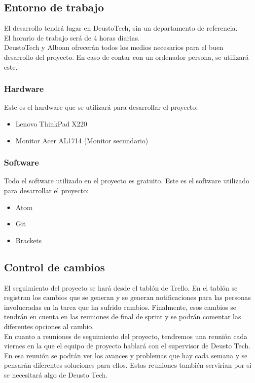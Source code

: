 \subsection{Entorno de trabajo}
El desarrollo tendrá lugar en DeustoTech, sin un departamento de referencia.\\

El horario de trabajo será de 4 horas diarias.\\

DeustoTech y Alboan ofrecerán todos los medios necesarios para el buen desarrollo del proyecto. En caso de contar con un ordenador persona, se utilizará este.

\subsubsection{Hardware}
Este es el hardware que se utilizará para desarrollar el proyecto:
\begin{itemize}
	\item Lenovo ThinkPad X220
	\item Monitor Acer AL1714 (Monitor secundario)
\end{itemize}

\subsubsection{Software}
Todo el software utilizado en el proyecto es gratuito. Este es el software utilizado para desarrollar el proyecto:
\begin{itemize}
	\item Atom
	\item Git
	\item Brackets
\end{itemize}

\subsection{Control de cambios}
El seguimiento del proyecto se hará desde el tablón de Trello. En el tablón se registran los cambios que se generan y se generan notificaciones para las personas involucradas en la tarea que ha sufrido cambios. Finalmente, esos cambios se tendrán en cuenta en las reuniones de final de sprint y se podrán comentar las diferentes opciones al cambio.\\

En cuanto a reuniones de seguimiento del proyecto, tendremos una reunión cada viernes en la que el equipo de proyecto hablará con el supervisor de Deusto Tech. En esa reunión se podrán ver los avances y problemas que hay cada semana y se pensarán diferentes soluciones para ellos. Estas reuniones también servirían por si se necesitará algo de Deusto Tech.


